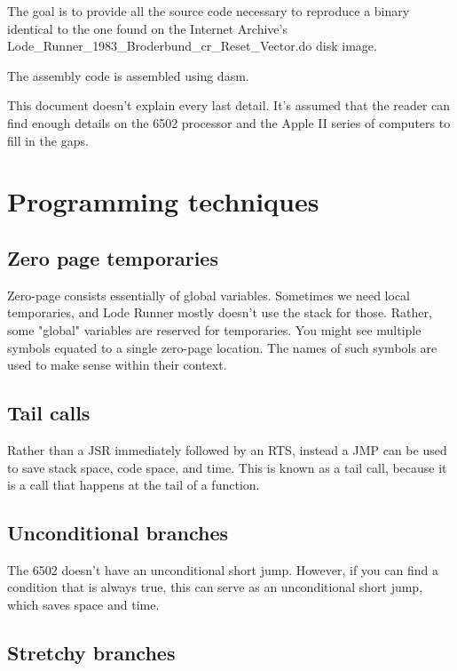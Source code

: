 \documentclass[10pt]{report}
\begin{document}
The goal is to provide all the source code necessary to reproduce a binary
identical to the one found on the Internet Archive's {\Tt{}Lode{\_}Runner{\_}1983{\_}Broderbund{\_}cr{\_}Reset{\_}Vector.do\nwendquote}
disk image.

The assembly code is assembled using {\Tt{}dasm\nwendquote}.

This document doesn't explain every last detail. It's assumed that the reader can
find enough details on the 6502 processor and the Apple II series of computers
to fill in the gaps.

\chapter{Programming techniques}

\section{Zero page temporaries}

Zero-page consists essentially of global variables. Sometimes we need local
temporaries, and Lode Runner mostly doesn't use the stack for those. Rather,
some "global" variables are reserved for temporaries. You might see multiple
symbols equated to a single zero-page location. The names of such symbols are
used to make sense within their context.

\section{Tail calls}

Rather than a {\Tt{}JSR\nwendquote} immediately followed by an {\Tt{}RTS\nwendquote}, instead a {\Tt{}JMP\nwendquote}
can be used to save stack space, code space, and time. This is known as a
tail call, because it is a call that happens at the tail of a function.

\section{Unconditional branches}

The 6502 doesn't have an unconditional short jump. However, if you can find
a condition that is always true, this can serve as an unconditional short
jump, which saves space and time.

\section{Stretchy branches}
\end{document}
